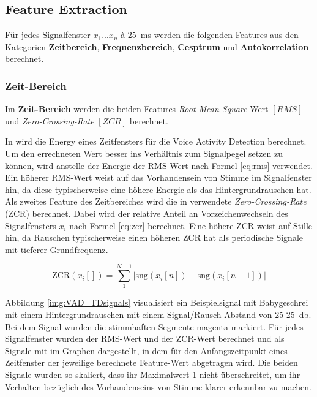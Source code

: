 \subsection{Feature Extraction}
\label{sec:featExtraction}


Für jedes Signalfenster $x_1...x_n$ à \SI{25}{\milli\second} werden die folgenden Features aus den Kategorien \textbf{Zeitbereich}, \textbf{Frequenzbereich}, \textbf{Cesptrum} und \textbf{Autokorrelation} berechnet.

\subsubsection{Zeit-Bereich}
\label{sec:timeFeats}

Im \textbf{Zeit-Bereich} werden die beiden Features \emph{Root-Mean-Square}-Wert $[RMS]$ und \emph{Zero-Crossing-Rate} $[ZCR]$ berechnet. 

In \cite{vad_Easy} wird die Energy eines Zeitfensters für die Voice Activity Detection berechnet. Um den errechneten Wert besser ins Verhältnis zum Signalpegel setzen zu können, wird anstelle der Energie der RMS-Wert nach Formel \ref{eq:rms} verwendet. Ein höherer RMS-Wert weist auf das Vorhandensein von Stimme im Signalfenster hin, da diese typischerweise eine höhere Energie als das Hintergrundrauschen hat. Als zweites Feature des Zeitbereiches wird die in \cite{vad_ceps} verwendete \emph{Zero-Crossing-Rate} (ZCR) berechnet. Dabei wird der relative Anteil an Vorzeichenwechseln des Signalfensters $x_i$ nach Formel \ref{eq:zcr} berechnet. Eine höhere ZCR weist auf Stille hin, da Rauschen typischerweise einen höheren ZCR hat als periodische Signale mit tieferer Grundfrequenz. 

\begin{equation}
\text{ZCR}(x_i[]) = \sum_{1}^{N-1}|\text{sng}(x_i[n])-\text{sng}(x_i[n-1])|
\label{eq:zcr}
\end{equation}

Abbildung \ref{img:VAD_TDsignals} visualisiert ein Beispielsignal mit Babygeschrei mit einem Hintergrundrauschen mit einem Signal/Rausch-Abstand von 25 \SI{25}{\decibel}. Bei dem Signal wurden die stimmhaften Segmente magenta markiert. Für jedes Signalfenster wurden der RMS-Wert und der ZCR-Wert berechnet und als Signale mit im Graphen dargestellt, in dem für den Anfangszeitpunkt eines Zeitfenster der jeweilige berechnete Feature-Wert abgetragen wird. Die beiden Signale wurden so skaliert, dass ihr Maximalwert 1 nicht überschreitet, um ihr Verhalten bezüglich des Vorhandenseins von Stimme klarer erkennbar zu machen.

